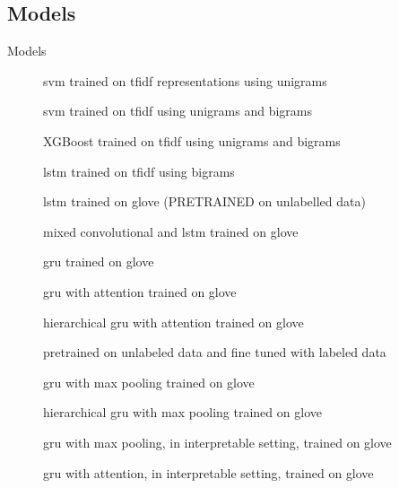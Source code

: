 \subsection{Models}
\begin{frame}{Models}
  \small
  \begin{description}
  \item[\svm] \alert{\acs{svm}} trained on \alert{\acs{tfidf}} representations using \alert{unigrams}
  \item[\svmb] \alert{\acs{svm}} trained on \alert{\acs{tfidf}} using
    \alert{unigrams} and \alert{bigrams}
  \item[\xgb] \alert{XGBoost} trained on \alert{\acs{tfidf}} using
    \alert{unigrams} and \alert{bigrams}
  \item[\lstmng] \alert{\acs{lstm}} trained on \alert{\acs{tfidf}} using
    \alert{bigrams}
  \item[\lstmb] \alert{\acs{lstm}} trained on \alert{\acs{glove}} (\alert{PRETRAINED} on unlabelled data)
  \item[\lstmc] mixed \alert{convolutional} and \alert{\ac{lstm}} trained on
    \alert{\acs{glove}}
  \item[\gru] \alert{\acs{gru}} trained on \alert{\acs{glove}}
  \item[\softmax] \alert{\acs{gru}} with \alert{attention} trained on \alert{\acs{glove}}
  \item[\softmaxh] \alert{hierarchical \acs{gru}} with \alert{attention} trained on \alert{\acs{glove}}
  \item[\bert] \alert{pretrained} on unlabeled data and \alert{fine tuned} with labeled data
  \item[\maxp] \alert{\acs{gru}} with \alert{max} pooling trained on \alert{\acs{glove}}
  \item[\maxh] \alert{hierarchical \acs{gru}} with \alert{max} pooling trained on \alert{\acs{glove}}
  \item[\maxi] \alert{\acs{gru}} with \alert{max} pooling, in \alert{interpretable} setting, trained on \alert{\acs{glove}}
  \item[\softmaxi] \alert{\acs{gru}} with \alert{attention}, in \alert{interpretable} setting, trained on \alert{\acs{glove}}
  \end{description}
\end{frame}

